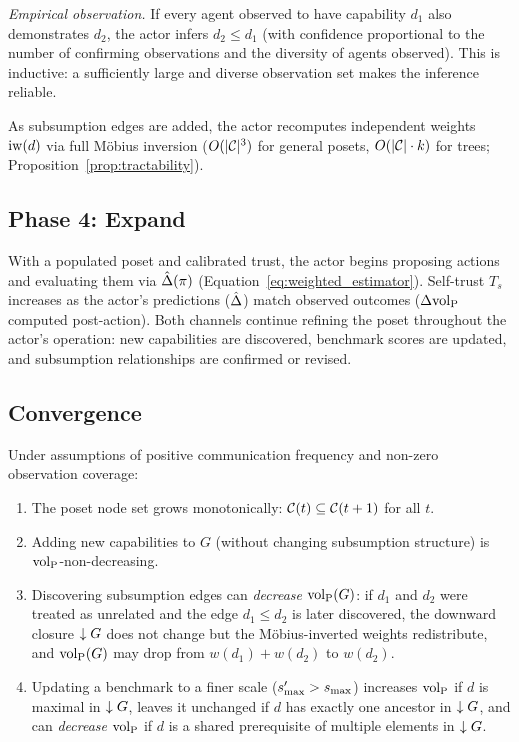 \emph{Empirical observation.} If every agent observed to have capability $d_1$
also demonstrates $d_2$, the actor infers $d_2 \leq d_1$ (with confidence
proportional to the number of confirming observations and the diversity of
agents observed). This is inductive: a sufficiently large and diverse
observation set makes the inference reliable.

As subsumption edges are added, the actor recomputes independent weights
$\operatorname{iw}(d)$ via full M\"{o}bius inversion ($O(|\mathcal{C}|^3)$ for general posets,
$O(|\mathcal{C}| \cdot k)$ for trees; Proposition~\ref{prop:tractability}).

\subsection{Phase 4: Expand}

With a populated poset and calibrated trust, the actor begins proposing
actions and evaluating them via $\hat{\Delta}(\pi)$
(Equation~\eqref{eq:weighted_estimator}). Self-trust $T_s$ increases as the
actor's predictions ($\hat{\Delta}$) match observed outcomes ($\Delta {\operatorname{vol}_{\mathrm{P}}}$
computed post-action). Both channels continue refining the poset throughout
the actor's operation: new capabilities are discovered, benchmark scores are
updated, and subsumption relationships are confirmed or revised.

\subsection{Convergence}

\begin{proposition}
\label{prop:bootstrap_convergence}
Under assumptions of positive communication frequency and non-zero observation
    coverage:
\begin{enumerate}
\item[\textbf{(a)}] The poset node set grows monotonically: $\mathcal{C}(t) \subseteq
    \mathcal{C}(t+1)$ for all $t$.
\item[\textbf{(b)}] Adding new capabilities to $G$ (without changing
    subsumption structure) is ${\operatorname{vol}_{\mathrm{P}}}$-non-decreasing.
\item[\textbf{(c)}] Discovering subsumption edges can \emph{decrease}
    ${\operatorname{vol}_{\mathrm{P}}}(G)$: if $d_1$ and $d_2$ were treated as unrelated and the edge
    $d_1 \leq d_2$ is later discovered, the downward closure $\downarrow G$ does not
    change but the M\"{o}bius-inverted weights redistribute, and ${\operatorname{vol}_{\mathrm{P}}}(G)$
    may drop from $w(d_1) + w(d_2)$ to $w(d_2)$.
\item[\textbf{(d)}] Updating a benchmark to a finer scale ($s_{\mathrm{max}}' > s_{\mathrm{max}}$)
    increases ${\operatorname{vol}_{\mathrm{P}}}$ if $d$ is maximal in $\downarrow G$, leaves it unchanged if $d$
    has exactly one ancestor in $\downarrow G$, and can \emph{decrease} ${\operatorname{vol}_{\mathrm{P}}}$ if $d$
    is a shared prerequisite of multiple elements in $\downarrow G$.
\end{enumerate}
\end{proposition}

